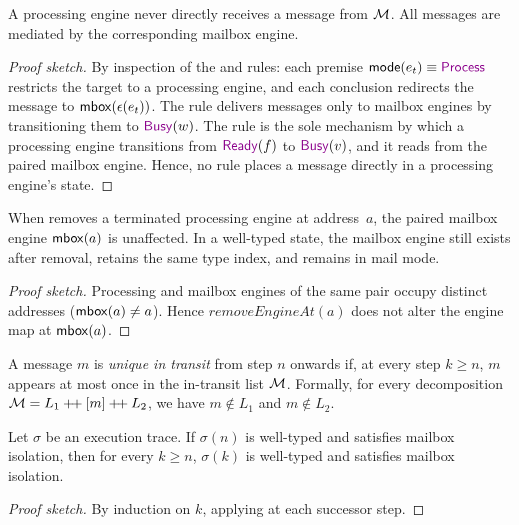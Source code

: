 \documentclass[
  a4paper,        %
  techreport,     %
]{art}
\begin{document}
\begin{proposition}\label{prop:mailbox-isolation}%
A processing engine never directly receives a message from $\mathcal{M}$.
All messages are mediated by the corresponding mailbox engine.
\end{proposition}
\begin{proof}[Proof sketch]
By inspection of the  and  rules: each premise
$\equal{\mode(\engine{t})}{\process}$ restricts the target to a processing
engine, and each conclusion redirects the message to
$\mathsf{mbox}(\epsilon(e_{t}))$. The  rule delivers
messages only to mailbox engines by transitioning them to $\busy{w}$. The
 rule is the sole mechanism by which a processing engine
transitions from $\ready{f}$ to $\busy{v}$, and it reads from the paired
mailbox engine. Hence, no rule places a message directly in a processing
engine's state.
\end{proof}

\begin{lemma}\label{lem:mailbox-persistence}
When  removes a terminated processing engine at address~$a$,
the paired mailbox engine $\mathsf{mbox}(a)$ is unaffected. In a well-typed
state, the mailbox engine still exists after removal, retains the same type
index, and remains in mail mode.
\end{lemma}
\begin{proof}[Proof sketch]
Processing and mailbox engines of the same pair occupy
distinct addresses ($\mathsf{mbox}(a) \neq a$). Hence
$\mathit{removeEngineAt}(a)$ does not alter the engine map at
$\mathsf{mbox}(a)$.
\end{proof}

\begin{definition}\label{def:unique-in-transit}
A message $m$ is \emph{unique in transit} from step $n$ onwards if, at every
step $k \geq n$, $m$ appears at most once in the in-transit list
$\mathcal{M}$. Formally, for every decomposition
$\mathcal{M} = L_{1} \mathbin{+\mkern-3mu+} [m] \mathbin{+\mkern-3mu+} L_{2}$, we have
$m \notin L_{1}$ and $m \notin L_{2}$.
\end{definition}

\begin{corollary}\label{cor:trace-invariants}
Let $\sigma$ be an execution trace. If $\sigma(n)$ is well-typed and satisfies
mailbox isolation, then for every $k \geq n$, $\sigma(k)$ is well-typed and
satisfies mailbox isolation.
\end{corollary}
\begin{proof}[Proof sketch]
By induction on $k$, applying
 at each successor step.
\end{proof}
\end{document}

